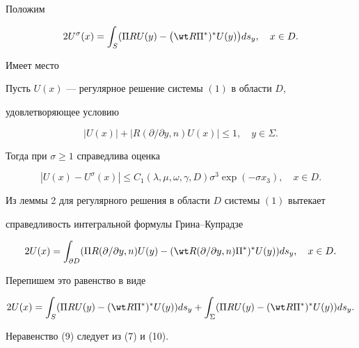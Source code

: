  


Положим 


\begin{equation} 


2U^\sigma(x)=\int_S(\Pi RU(y)- 


\big(\wt R\Pi^*)^* U(y)\big)ds_y,\quad x\in D. 


\end{equation} 


 


Имеет место 


 


\begin{thm} 


Пусть $U(x)$ --- регулярное решение системы $(1)$ в области $D$, 


удовлетворяющее условию 


$$ 


|U(x)|+|R(\partial/\partial y,n)U(x)|\le 1,\quad y\in\Sigma. 


$$ 


Тогда при $\sigma\ge 1$ справедлива оценка 


\begin{equation} 


|U(x)-U^\sigma(x)|\le C_1(\lambda,\mu,\omega,\gamma,D) 


\sigma^3\exp(-\sigma x_3),\quad x\in D. 


\end{equation} 


\end{thm} 


 


\begin{pf} 


Из леммы 2 для регулярного решения в области $D$ системы $(1)$ вытекает 


справедливость интегральной формулы Грина--Купрадзе \cite{1} 


$$ 


2U(x)=\int_{\partial D}(\Pi R(\partial/\partial y,n)U(y)- 


(\wt R(\partial/\partial y,n)\Pi^*)^* U(y))ds_y,\quad x\in D. 


$$ 


Перепишем это равенство в виде 


\begin{equation} 


2U(x)=\int_S(\Pi RU(y)-(\wt R\Pi^*)^* U(y))ds_y+ 


\int_\Sigma(\Pi RU(y)-(\wt R\Pi^*)^* U(y))ds_y. 


\end{equation} 


Неравенство (9) следует из (7) и (10). 


\end{pf} 


